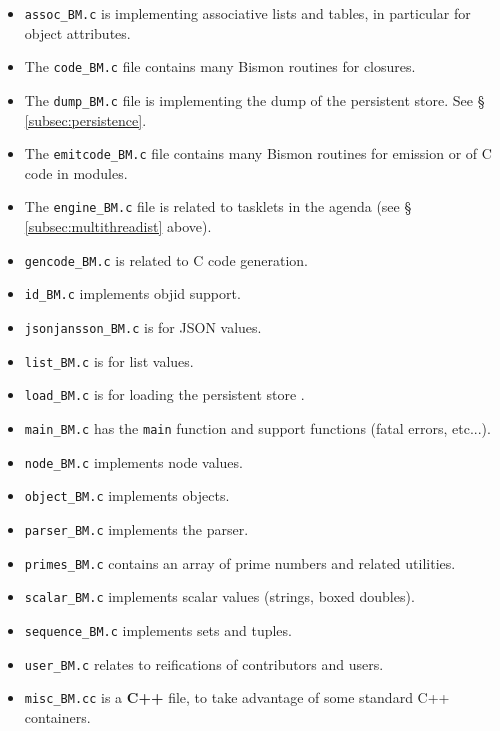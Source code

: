 \begin{itemize}
  \item \texttt{assoc\_BM.c} is implementing associative lists and
    tables,    in
    particular for object attributes.

  \item The \texttt{code\_BM.c} file contains many Bismon routines for
     closures.

  \item The \texttt{dump\_BM.c} file is implementing the  dump of the
      persistent store.   See \S
      \ref{subsec:persistence}.

  \item The \texttt{emitcode\_BM.c} file contains many Bismon routines
    for  emission or  of C code in
     modules.

  \item The \texttt{engine\_BM.c} file is related to  tasklets in the agenda (see \S
    \ref{subsec:multithreadist} above).

  \item \texttt{gencode\_BM.c} is related to C code generation.

  \item \texttt{id\_BM.c} implements objid support.

  \item \texttt{jsonjansson\_BM.c} is for JSON values.

  \item \texttt{list\_BM.c} is for list values.

  \item \texttt{load\_BM.c} is for loading the persistent store
   .

  \item \texttt{main\_BM.c} has the \texttt{main} function and support functions (fatal errors, etc...).

  \item \texttt{node\_BM.c} implements node values.

  \item \texttt{object\_BM.c} implements objects.

  \item \texttt{parser\_BM.c} implements the parser.

  \item \texttt{primes\_BM.c} contains an array of prime numbers and related utilities.

  \item \texttt{scalar\_BM.c} implements scalar values (strings, boxed doubles).

  \item \texttt{sequence\_BM.c} implements sets and tuples.

  \item \texttt{user\_BM.c} relates to reifications of contributors and
  users.

  \item \texttt{misc\_BM.cc} is a \textbf{C++} file, to take advantage of some standard C++ containers.
\end{itemize}

